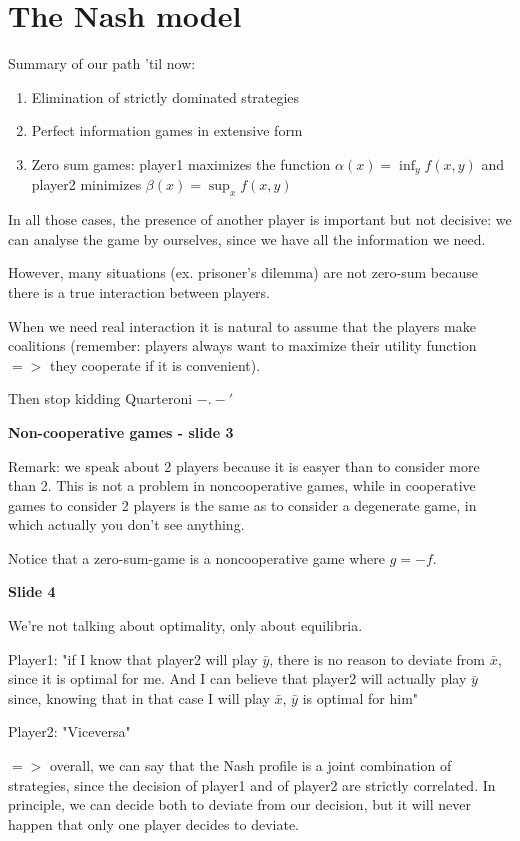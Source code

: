 \documentclass[pt11,a4paper,twoside,reqno,openright]{paper}
\begin{document}
\section{The Nash model}

\noindent Summary of our path 'til now:
\begin{enumerate}
	\item Elimination of strictly dominated strategies
	\item Perfect information games in extensive form
	\item Zero sum games: player1 maximizes the function
		$\alpha(x) = \inf_y{f(x,y)}$ and player2 minimizes
		$\beta(x) = \sup_x{f(x,y)}$
\end{enumerate}
In all those cases, the presence of another player is important but not 
decisive: we can analyse the game by ourselves, since we have all the 
information we need.

\noindent However, many situations (ex. prisoner's dilemma) are not 
zero-sum because there is a true interaction between players.

\noindent When we need real interaction it is natural to assume that the 
players make coalitions (remember: players always want to maximize 
their utility function $=>$ they cooperate if it is convenient).

{\huge Then stop kidding Quarteroni $-.-'$ }

\bigskip
\noindent \textbf{Non-cooperative games - slide 3}

\noindent Remark: we speak about 2 players because it is easyer than 
to consider more than 2. This is not a problem in noncooperative games, 
while in cooperative games to consider 2 players is the same as to 
consider a degenerate game, in which actually you don't see anything.

\noindent Notice that a zero-sum-game is a noncooperative game where 
$g=-f$.

\bigskip
\noindent \textbf{Slide 4}

\noindent We're not talking about optimality, only about equilibria.

\noindent Player1: "if I know that player2 will play $\bar{y}$, there 
is no reason to deviate from $\bar{x}$, since it is optimal for me. 
And I can believe that player2 will actually play $\bar{y}$ since, 
knowing that in that case I will play $\bar{x}$, $\bar{y}$ is optimal 
for him"

\noindent Player2: "Viceversa"

\noindent $=>$ overall, we can say that the Nash profile is a joint 
combination of strategies, since the decision of player1 and of 
player2 are strictly correlated. In principle, we can decide both to 
deviate from our decision, but it will never happen that only one 
player decides to deviate.
\end{document}

